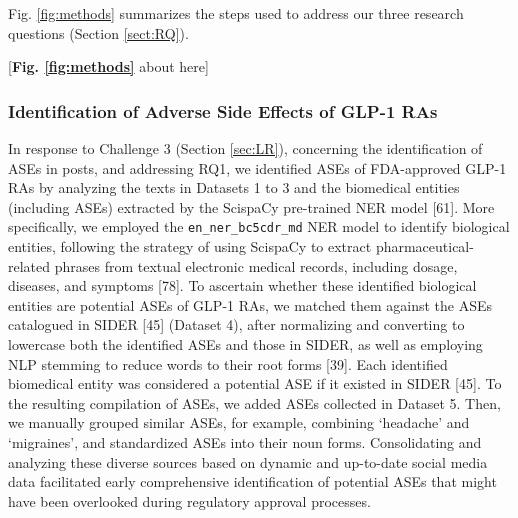 \documentclass[referee,bst/sn-basic]{sn-jnl}%
\begin{document}
Fig. \ref{fig:methods} summarizes the steps used to address our three research questions (Section \ref{sect:RQ}).

\begin{center}
[\textbf{Fig. \ref{fig:methods}} about here] 
\end{center}

\begin{comment}
    
\begin{figure}[H]
    \centering
    \texttt{[image: images/methods.pdf]}
    \caption{Overview of the methodology of this research.}
    \label{fig:methods}
\end{figure}

\end{comment}
\subsubsection{Identification of Adverse Side Effects of GLP-1 RAs} 
\label{sec:ASE}
In response to Challenge 3 (Section \ref{sec:LR}), concerning the identification of ASEs in posts, and addressing RQ1, we identified ASEs of FDA-approved GLP-1 RAs by analyzing the texts in Datasets 1 to 3 and the biomedical entities (including ASEs) extracted by the ScispaCy pre-trained NER model [61]. 
More specifically, we employed the \texttt{en\_ner\_bc5cdr\_md} NER model to identify biological entities, following the strategy of using ScispaCy to extract pharmaceutical-related phrases from textual electronic medical records, including dosage, diseases, and symptoms [78]. 
To ascertain whether these identified biological entities are potential ASEs of GLP-1 RAs, we matched them against the ASEs catalogued in SIDER [45] 
(Dataset 4), after normalizing and converting to lowercase both the identified ASEs and those in SIDER, as well as employing NLP stemming to reduce words to their root forms [39]. 
Each identified biomedical entity was considered a potential ASE if it existed in SIDER [45]. 
To the resulting compilation of ASEs, we added ASEs collected in Dataset 5. 
Then, we manually grouped similar ASEs, for example, combining `headache' and `migraines', and standardized ASEs into their noun forms. 
Consolidating and analyzing these diverse sources based on dynamic and up-to-date social media data facilitated early comprehensive identification of potential ASEs that might have been overlooked during regulatory approval processes.
\end{document}
